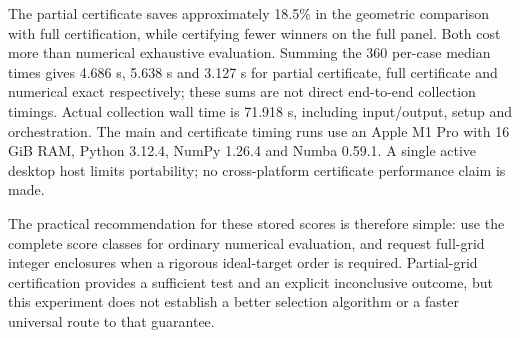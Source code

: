 The partial certificate saves approximately 18.5\% in the geometric
comparison with full certification, while certifying fewer winners on
the full panel. Both cost more than numerical exhaustive evaluation.
Summing the 360 per-case median times gives 4.686 s, 5.638 s and 3.127 s
for partial certificate, full certificate and numerical exact respectively;
these sums are not direct end-to-end collection timings. Actual collection
wall time is 71.918 s, including input/output, setup and orchestration.
The main and certificate timing runs use an Apple M1 Pro with 16 GiB RAM,
Python 3.12.4, NumPy 1.26.4 and Numba 0.59.1. A single active desktop host
limits portability; no cross-platform certificate performance claim is made.

The practical recommendation for these stored scores is therefore simple:
use the complete score classes for ordinary numerical evaluation, and
request full-grid integer enclosures when a rigorous ideal-target order
is required. Partial-grid certification provides a sufficient test and an
explicit inconclusive outcome, but this experiment does not establish a
better selection algorithm or a faster universal route to that guarantee.
